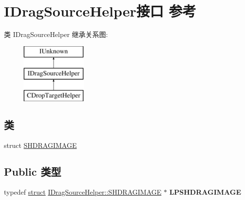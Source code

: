 \hypertarget{interface_i_drag_source_helper}{}\section{I\+Drag\+Source\+Helper接口 参考}
\label{interface_i_drag_source_helper}
类 I\+Drag\+Source\+Helper 继承关系图\+:\begin{figure}[H]
\begin{center}
\leavevmode
\includegraphics[height=3.000000cm]{interface_i_drag_source_helper}
\end{center}
\end{figure}
\subsection*{类}
\begin{DoxyCompactItemize}
\item 
struct \hyperlink{struct_i_drag_source_helper_1_1_s_h_d_r_a_g_i_m_a_g_e}{S\+H\+D\+R\+A\+G\+I\+M\+A\+GE}
\end{DoxyCompactItemize}
\subsection*{Public 类型}
\begin{DoxyCompactItemize}
\item 
\mbox{\label{interface_i_drag_source_helper_ab917c97ccee9f2351c8a8e206ba52d7f}} 
typedef \hyperlink{interfacestruct}{struct} \hyperlink{struct_i_drag_source_helper_1_1_s_h_d_r_a_g_i_m_a_g_e}{I\+Drag\+Source\+Helper\+::\+S\+H\+D\+R\+A\+G\+I\+M\+A\+GE} $\ast$ {\bfseries L\+P\+S\+H\+D\+R\+A\+G\+I\+M\+A\+GE}
\end{DoxyCompactItemize}
